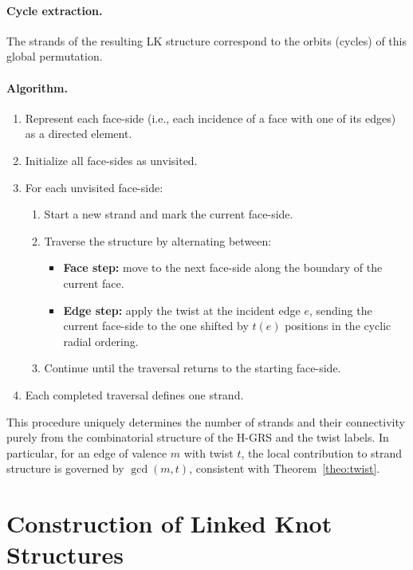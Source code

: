 \documentclass[acmtog,anonymous,review]{acmart}
\begin{document}
\paragraph{Cycle extraction.}
The strands of the resulting LK structure correspond to the orbits (cycles) of this global permutation.

\paragraph{Algorithm.}
\begin{enumerate}
    \item Represent each face-side (i.e., each incidence of a face with one of its edges) as a directed element.
    \item Initialize all face-sides as unvisited.
    \item For each unvisited face-side:
    \begin{enumerate}
        \item Start a new strand and mark the current face-side.
        \item Traverse the structure by alternating between:
        \begin{itemize}
            \item \textbf{Face step:} move to the next face-side along the boundary of the current face.
            \item \textbf{Edge step:} apply the twist at the incident edge $e$, sending the current face-side to the one shifted by $t(e)$ positions in the cyclic radial ordering.
        \end{itemize}
        \item Continue until the traversal returns to the starting face-side.
    \end{enumerate}
    \item Each completed traversal defines one strand.
\end{enumerate}

This procedure uniquely determines the number of strands and their connectivity purely from the combinatorial structure of the H-GRS and the twist labels. In particular, for an edge of valence $m$ with twist $t$, the local contribution to strand structure is governed by $\gcd(m, t)$, consistent with Theorem~\ref{theo:twist}.



\section{Construction of Linked Knot Structures}
\end{document}

